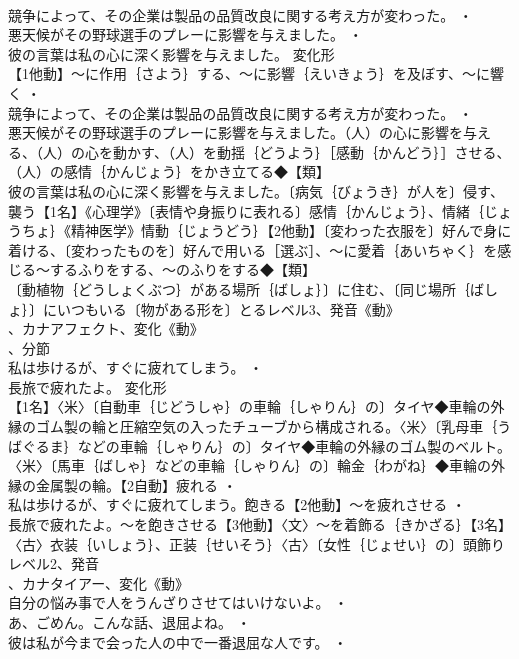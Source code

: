 \documentclass[8pt]{extreport}
\begin{document}
\begin{CJK}{UTF8}{min}
\\	競争によって、その企業は製品の品質改良に関する考え方が変わった。 ・
\\	悪天候がその野球選手のプレーに影響を与えました。 ・
\\	彼の言葉は私の心に深く影響を与えました。	変化形 
\\	【1他動】～に作用｛さよう｝する、～に影響｛えいきょう｝を及ぼす、～に響く ・
\\	競争によって、その企業は製品の品質改良に関する考え方が変わった。 ・
\\	悪天候がその野球選手のプレーに影響を与えました。（人）の心に影響を与える、（人）の心を動かす、（人）を動揺｛どうよう｝［感動｛かんどう｝］させる、（人）の感情｛かんじょう｝をかき立てる◆【類】
\\	彼の言葉は私の心に深く影響を与えました。〔病気｛びょうき｝が人を〕侵す、襲う【1名】《心理学》〔表情や身振りに表れる〕感情｛かんじょう｝、情緒｛じょうちょ｝《精神医学》情動｛じょうどう｝【2他動】〔変わった衣服を〕好んで身に着ける、〔変わったものを〕好んで用いる［選ぶ］、～に愛着｛あいちゃく｝を感じる～するふりをする、～のふりをする◆【類】
\\	〔動植物｛どうしょくぶつ｝がある場所｛ばしょ｝〕に住む、〔同じ場所｛ばしょ｝〕にいつもいる〔物がある形を〕とるレベル3、発音《動》
\\	、カナアフェクト、変化《動》
\\	、分節
\\	私は歩けるが、すぐに疲れてしまう。 ・
\\	長旅で疲れたよ。	変化形 
\\	【1名】〈米〉〔自動車｛じどうしゃ｝の車輪｛しゃりん｝の〕タイヤ◆車輪の外縁のゴム製の輪と圧縮空気の入ったチューブから構成される。〈米〉〔乳母車｛うばぐるま｝などの車輪｛しゃりん｝の〕タイヤ◆車輪の外縁のゴム製のベルト。〈米〉〔馬車｛ばしゃ｝などの車輪｛しゃりん｝の〕輪金｛わがね｝◆車輪の外縁の金属製の輪。【2自動】疲れる ・
\\	私は歩けるが、すぐに疲れてしまう。飽きる【2他動】～を疲れさせる ・
\\	長旅で疲れたよ。～を飽きさせる【3他動】〈文〉～を着飾る｛きかざる｝【3名】〈古〉衣装｛いしょう｝、正装｛せいそう｝〈古〉〔女性｛じょせい｝の〕頭飾りレベル2、発音
\\	、カナタイアー、変化《動》
\\	自分の悩み事で人をうんざりさせてはいけないよ。 ・
\\	あ、ごめん。こんな話、退屈よね。 ・
\\	彼は私が今まで会った人の中で一番退屈な人です。 ・

\end{CJK}
\end{document}
